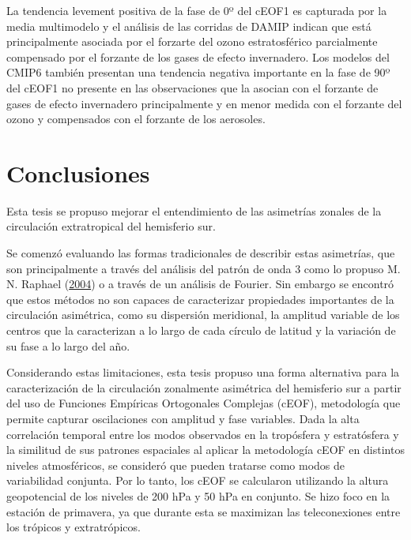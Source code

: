 \documentclass[12pt,oneside,a4paper]{reedthesis}
\begin{document}
La tendencia levement positiva de la fase de 0º del cEOF1 es capturada por la media multimodelo y el análisis de las corridas de DAMIP indican que está principalmente asociada por el forzarte del ozono estratosférico parcialmente compensado por el forzante de los gases de efecto invernadero.
Los modelos del CMIP6 también presentan una tendencia negativa importante en la fase de 90º del cEOF1 no presente en las observaciones que la asocian con el forzante de gases de efecto invernadero principalmente y en menor medida con el forzante del ozono y compensados con el forzante de los aerosoles.

\hypertarget{conclusiones}{%
\chapter{Conclusiones}\label{conclusiones}}

Esta tesis se propuso mejorar el entendimiento de las asimetrías zonales de la circulación extratropical del hemisferio sur.

Se comenzó evaluando las formas tradicionales de describir estas asimetrías, que son principalmente a través del análisis del patrón de onda 3 como lo propuso M. N. Raphael (\protect\hyperlink{ref-raphael2004}{2004}) o a través de un análisis de Fourier.
Sin embargo se encontró que estos métodos no son capaces de caracterizar propiedades importantes de la circulación asimétrica, como su dispersión meridional, la amplitud variable de los centros que la caracterizan a lo largo de cada círculo de latitud y la variación de su fase a lo largo del año.

Considerando estas limitaciones, esta tesis propuso una forma alternativa para la caracterización de la circulación zonalmente asimétrica del hemisferio sur a partir del uso de Funciones Empíricas Ortogonales Complejas (cEOF), metodología que permite capturar oscilaciones con amplitud y fase variables.
Dada la alta correlación temporal entre los modos observados en la tropósfera y estratósfera y la similitud de sus patrones espaciales al aplicar la metodología cEOF en distintos niveles atmosféricos, se consideró que pueden tratarse como modos de variabilidad conjunta.
Por lo tanto, los cEOF se calcularon utilizando la altura geopotencial de los niveles de 200 hPa y 50 hPa en conjunto.
Se hizo foco en la estación de primavera, ya que durante esta se maximizan las teleconexiones entre los trópicos y extratrópicos.
\end{document}
